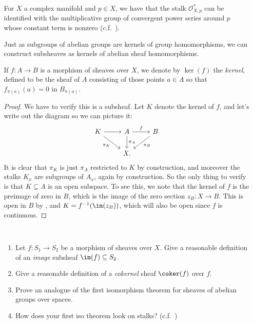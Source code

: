 \documentclass[11pt]{book}
\begin{document}
\begin{example} For $X$ a complex manifold and $p \in X$, we have that the stalk $\mathcal{O}_{X,p}^\ast$ can be identified with the multiplicative group of convergent power series around $p$ whose constant term is nonzero (c.f.~).
\end{example}



Just as subgroups of abelian groups are kernels of group homomorphisms, we can construct subsheaves as kernels of abelian sheaf homomorphisms.

\begin{proposition} If $f \colon A \to B$ is a morphism of sheaves over $X$, we denote by $\ker(f)$ the \emph{kernel}, defined to be the sheaf of $A$ consisting of those points $a\in A$ so that  $f_{\pi(a)}(a) = 0$ in $B_{\pi(a)}$.
\end{proposition}
\begin{proof} We have to verify this is a subsheaf. Let $K$ denote the kernel of $f$, and let's write out the diagram so we can picture it:
\[ \begin{tikzcd}
    K\ar[dr,"\pi_K" below left]\rar & A\dar["\pi_A"]\rar["f"] & B\ar[dl,"\pi_B"]\\
     & X. & 
\end{tikzcd} \]
It is clear that $\pi_K$ is just $\pi_A$ restricted to $K$ by construction, and moreover the stalks $K_x$ are subgroups of $A_x$, again by construction. So the only thing to verify is that $K \subseteq A$ is an open subspace. To see this, we note that the kernel of $f$ is the preimage of zero in $B$, which is the image of the zero section $z_B \colon X \to B$. This is open in $B$ by , and $K = f^{-1}(\im(z_B))$, which will also be open since $f$ is continuous.
\end{proof}

\begin{exercise} \,
\begin{enumerate}
    \item Let $f \colon S_1 \to S_2$ be a morphism of sheaves over $X$. Give a reasonable definition of an \emph{image} subsheaf $\im(f) \subseteq S_2$.
    \item Give a reasonable definition of a \emph{cokernel} sheaf $\coker(f)$ over $f$.
    \item Prove an analogue of the first isomorphism theorem for sheaves of abelian groups over spaces.
    \item How does your first iso theorem look on stalks? (c.f.~)
\end{enumerate}
\end{exercise}
\end{document}
